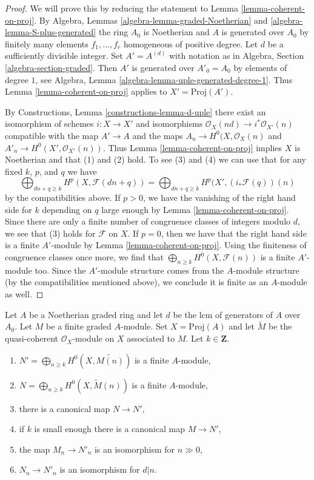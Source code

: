 \begin{proof}
We will prove this by reducing the statement to
Lemma \ref{lemma-coherent-on-proj}.
By Algebra, Lemmas \ref{algebra-lemma-graded-Noetherian} and
\ref{algebra-lemma-S-plus-generated} the ring $A_0$ is Noetherian
and $A$ is generated over $A_0$ by finitely many elements
$f_1, \ldots, f_r$ homogeneous of positive degree.
Let $d$ be a sufficiently divisible integer. Set $A' = A^{(d)}$ with notation
as in Algebra, Section \ref{algebra-section-graded}.
Then $A'$ is generated over $A'_0 = A_0$ by elements of
degree $1$, see Algebra, Lemma \ref{algebra-lemma-uple-generated-degree-1}.
Thus Lemma \ref{lemma-coherent-on-proj} applies to $X' = \text{Proj}(A')$.

\medskip\noindent
By Constructions, Lemma \ref{constructions-lemma-d-uple} there exist
an isomorphism of schemes $i : X \to X'$ and
isomorphisms $\mathcal{O}_X(nd) \to i^*\mathcal{O}_{X'}(n)$
compatible with the map $A' \to A$ and the maps
$A_n \to H^0(X, \mathcal{O}_X(n)$ and $A'_n \to H^0(X', \mathcal{O}_{X'}(n))$.
Thus Lemma \ref{lemma-coherent-on-proj} implies $X$ is Noetherian and that
(1) and (2) hold. To see (3) and (4)
we can use that for any fixed $k$, $p$, and $q$ we have
$$
\bigoplus\nolimits_{dn + q \geq k} H^p(X, \mathcal{F}(dn + q)) =
\bigoplus\nolimits_{dn + q \geq k} H^p(X', (i_*\mathcal{F}(q))(n)
$$
by the compatibilities above. If $p > 0$, we have the vanishing of the right
hand side for $k$ depending on $q$ large enough by
Lemma \ref{lemma-coherent-on-proj}. Since there are only a finite number
of congruence classes of integers modulo $d$, we see that (3) holds for
$\mathcal{F}$ on $X$. If $p = 0$, then we have that the right hand side
is a finite $A'$-module by Lemma \ref{lemma-coherent-on-proj}. Using
the finiteness of congruence classes once more, we find that
$\bigoplus_{n \geq k} H^0(X, \mathcal{F}(n))$ is a finite $A'$-module too.
Since the $A'$-module structure comes from the $A$-module structure
(by the compatibilities mentioned above), we conclude it is finite
as an $A$-module as well.
\end{proof}

\begin{lemma}
\label{lemma-recover-tail-graded-module-general}
Let $A$ be a Noetherian graded ring and let $d$ be the lcm of generators
of $A$ over $A_0$. Let $M$ be a finite graded $A$-module.
Set $X = \text{Proj}(A)$ and let $\widetilde{M}$ be
the quasi-coherent $\mathcal{O}_X$-module on $X$ associated to $M$.
Let $k \in \mathbf{Z}$.
\begin{enumerate}
\item $N' = \bigoplus_{n \geq k} H^0(X, \widetilde{M(n)})$
is a finite $A$-module,
\item $N = \bigoplus_{n \geq k} H^0(X, \widetilde{M}(n))$
is a finite $A$-module,
\item there is a canonical map $N \to N'$,
\item if $k$ is small enough there is a canonical map $M \to N'$,
\item the map $M_n \to N'_n$ is an isomorphism for $n \gg 0$,
\item $N_n \to N'_n$ is an isomorphism for $d | n$.
\end{enumerate}
\end{lemma}


